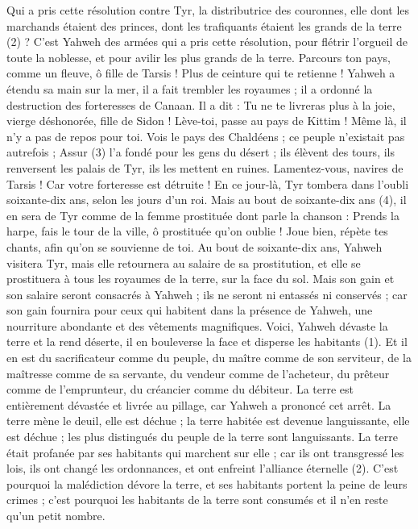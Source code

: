 \begin{multicols}{2}
Qui a pris cette résolution contre Tyr, la distributrice des couronnes, elle dont les marchands étaient des princes, dont les trafiquants étaient les grands de la terre (2) ?
C’est Yahweh des armées qui a pris cette résolution, pour flétrir l'orgueil de toute la noblesse, et pour avilir les plus grands de la terre.
Parcours ton pays, comme un fleuve, ô fille de Tarsis ! Plus de ceinture qui te retienne !
Yahweh a étendu sa main sur la mer, il a fait trembler les royaumes ; il a ordonné la destruction des forteresses de Canaan.
Il a dit : Tu ne te livreras plus à la joie, vierge déshonorée, fille de Sidon ! Lève-toi, passe au pays de Kittim ! Même là, il n’y a pas de repos pour toi.
Vois le pays des Chaldéens ; ce peuple n’existait pas autrefois ; Assur (3) l'a fondé pour les gens du désert ; ils élèvent des tours, ils renversent les palais de Tyr, ils les mettent en ruines.
Lamentez-vous, navires de Tarsis ! Car votre forteresse est détruite !
En ce jour-là, Tyr tombera dans l’oubli soixante-dix ans, selon les jours d'un roi. Mais au bout de soixante-dix ans (4), il en sera de Tyr comme de la femme prostituée dont parle la chanson :
Prends la harpe, fais le tour de la ville, ô prostituée qu’on oublie ! Joue bien, répète tes chants, afin qu'on se souvienne de toi.
Au bout de soixante-dix ans, Yahweh visitera Tyr, mais elle retournera au salaire de sa prostitution, et elle se prostituera à tous les royaumes de la terre, sur la face du sol.
Mais son gain et son salaire seront consacrés à Yahweh ; ils ne seront ni entassés ni conservés ; car son gain fournira pour ceux qui habitent dans la présence de Yahweh, une nourriture abondante et des vêtements magnifiques.
\VerseOne{}Voici, Yahweh dévaste la terre et la rend déserte, il en bouleverse la face et disperse les habitants (1).
Et il en est du sacrificateur comme du peuple, du maître comme de son serviteur, de la maîtresse comme de sa servante, du vendeur comme de l'acheteur, du prêteur comme de l’emprunteur, du créancier comme du débiteur.
La terre est entièrement dévastée et livrée au pillage, car Yahweh a prononcé cet arrêt.
La terre mène le deuil, elle est déchue ; la terre habitée est devenue languissante, elle est déchue ; les plus distingués du peuple de la terre sont languissants.
La terre était profanée par ses habitants qui marchent sur elle ; car ils ont transgressé les lois, ils ont changé les ordonnances, et ont enfreint l'alliance éternelle (2).
C'est pourquoi la malédiction dévore la terre, et ses habitants portent la peine de leurs crimes ; c’est pourquoi les habitants de la terre sont consumés et il n’en reste qu’un petit nombre.

\end{multicols}

